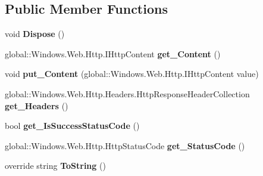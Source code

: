 \subsection*{Public Member Functions}
\begin{DoxyCompactItemize}
\item 
\mbox{\label{class_windows_1_1_web_1_1_http_1_1_http_response_message_a79ea29d0bc40d8bc64102d96f59aebf4}} 
void {\bfseries Dispose} ()
\item 
\mbox{\label{class_windows_1_1_web_1_1_http_1_1_http_response_message_aa742acc5e70c1d817b438ea41be4de12}} 
global\+::\+Windows.\+Web.\+Http.\+I\+Http\+Content {\bfseries get\+\_\+\+Content} ()
\item 
\mbox{\label{class_windows_1_1_web_1_1_http_1_1_http_response_message_a3cb8022988b8e1a2586f7a102281c88c}} 
void {\bfseries put\+\_\+\+Content} (global\+::\+Windows.\+Web.\+Http.\+I\+Http\+Content value)
\item 
\mbox{\label{class_windows_1_1_web_1_1_http_1_1_http_response_message_aaca34cdc610c5bae128167860b27d451}} 
global\+::\+Windows.\+Web.\+Http.\+Headers.\+Http\+Response\+Header\+Collection {\bfseries get\+\_\+\+Headers} ()
\item 
\mbox{\label{class_windows_1_1_web_1_1_http_1_1_http_response_message_a91963a9e973727c0e5c97fcc0ead8060}} 
bool {\bfseries get\+\_\+\+Is\+Success\+Status\+Code} ()
\item 
\mbox{\label{class_windows_1_1_web_1_1_http_1_1_http_response_message_a559b5594bd74d83fdc6617968b8a0d95}} 
global\+::\+Windows.\+Web.\+Http.\+Http\+Status\+Code {\bfseries get\+\_\+\+Status\+Code} ()
\item 
\mbox{\label{class_windows_1_1_web_1_1_http_1_1_http_response_message_a41a46b8ee759bbf5b15b954f928eb816}} 
override string {\bfseries To\+String} ()
\item 

\end{DoxyCompactItemize}
